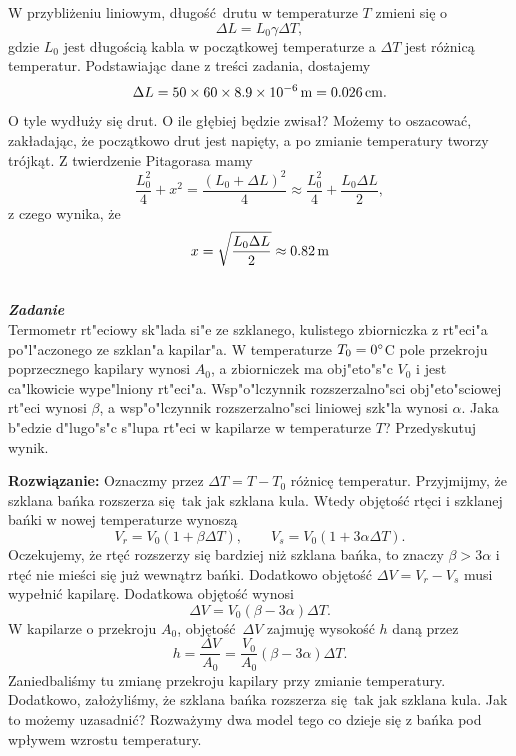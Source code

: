 \documentclass[11pt,a4paper]{article}
\newcounter{zadanie}\newcommand{\zadanie}[1][]{\addtocounter{zadanie}{1} ~\\  {\bf \emph{Zadanie \arabic{zadanie} #1 }} \\}
\begin{document}
\vskip 10pt

W przybliżeniu liniowym, długość drutu w temperaturze $T$ zmieni się o
\begin{equation}
	\Delta L = L_0 \gamma \Delta T,
\end{equation}
gdzie $L_0$ jest długością kabla w początkowej temperaturze a $\Delta T$ jest różnicą temperatur. Podstawiając dane z treści zadania, dostajemy
\begin{equation}
	\Delta L = 50\times 60 \times 8.9 \times 10^{-6}\,{\rm m} =  0.026\, {\rm cm}.
\end{equation}
O tyle wydłuży się drut. O ile głębiej będzie zwisał? Możemy to oszacować, zakładając, że początkowo drut jest napięty, a po zmianie temperatury tworzy trójkąt. Z twierdzenie Pitagorasa mamy
\begin{equation}
	\frac{L_0^2}{4} + x^2 = \frac{(L_0 + \Delta L)^2}{4} \approx \frac{L_0^2}{4} + \frac{L_0 \Delta L}{2},
\end{equation}
z czego wynika, że 
\begin{equation}
	x = \sqrt{\frac{L_0 \Delta L}{2}} \approx 0.82\, {\rm m}
\end{equation}

\zadanie
Termometr rt"eciowy sk"lada si"e ze szklanego, kulistego zbiorniczka z rt"eci"a po"l"aczonego ze szklan"a kapilar"a. W temperaturze $T_0=0\degree$C
pole przekroju poprzecznego kapilary wynosi $A_0$,
a zbiorniczek ma obj"eto"s"c $V_0$ i jest ca"lkowicie wype"lniony rt"eci"a. Wsp"o"lczynnik rozszerzalno"sci
obj"eto"sciowej rt"eci wynosi $\beta$, a wsp"o"lczynnik rozszerzalno"sci
liniowej szk"la wynosi $\alpha$. Jaka b"edzie d"lugo"s"c s"lupa rt"eci w kapilarze w temperaturze $T$? Przedyskutuj wynik.

\vskip 10pt

\textbf{Rozwiązanie:} Oznaczmy przez $\Delta T = T - T_0$ różnicę temperatur. Przyjmijmy, że szklana bańka rozszerza się tak jak szklana kula. Wtedy objętość rtęci i szklanej bańki w nowej temperaturze wynoszą
\begin{equation}
	V_r = V_0( 1 + \beta \Delta T), \qquad V_s = V_0(1 + 3 \alpha \Delta T).
\end{equation} 
Oczekujemy, że rtęć rozszerzy się bardziej niż szklana bańka, to znaczy $\beta > 3 \alpha$ i rtęć nie mieści się już wewnątrz bańki. Dodatkowo objętość $\Delta V = V_r - V_s$ musi wypełnić kapilarę. Dodatkowa objętość wynosi
\begin{equation}
	\Delta V = V_0 (\beta - 3\alpha) \Delta T.
\end{equation}
W kapilarze o przekroju $A_0$, objętość $\Delta V$ zajmuję wysokość $h$ daną przez
\begin{equation}
	h = \frac{\Delta V}{A_0} = \frac{V_0}{A_0} (\beta - 3\alpha) \Delta T.
\end{equation}
Zaniedbaliśmy tu zmianę przekroju kapilary przy zmianie temperatury. Dodatkowo, założyliśmy, że szklana bańka rozszerza się tak jak szklana kula. Jak to możemy uzasadnić? Rozważymy dwa model tego co dzieje się z bańka pod wpływem wzrostu temperatury.
\end{document}
